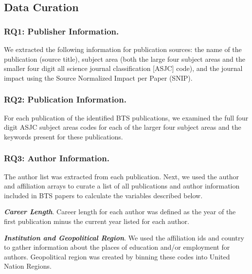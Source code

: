 \documentclass[
  man,floatsintext]{apa6}
\begin{document}
\hypertarget{data-curation}{%
\subsection{Data Curation}\label{data-curation}}

\hypertarget{rq1-publisher-information.}{%
\subsubsection{RQ1: Publisher Information.}\label{rq1-publisher-information.}}

We extracted the following information for publication sources: the name of the publication (source title), subject area (both the large four subject areas and the smaller four digit all science journal classification {[}ASJC{]} code), and the journal
impact using the Source Normalized Impact per Paper (SNIP).

\hypertarget{rq2-publication-information.}{%
\subsubsection{RQ2: Publication Information.}\label{rq2-publication-information.}}

For each publication of the identified BTS publications, we examined
the full four digit ASJC subject areas codes for each of the larger four
subject areas and the keywords present for these publications.

\hypertarget{rq3-author-information.}{%
\subsubsection{RQ3: Author Information.}\label{rq3-author-information.}}

The author list was extracted from each publication. Next, we used the author and affiliation arrays to curate a list of all publications and author information included in BTS papers to calculate the variables described below.

\textbf{\emph{Career Length}}. Career length for each author was defined as
the year of the first publication minus the current year listed for each author.

\textbf{\emph{Institution and Geopolitical Region}}. We used the affiliation
ids and country to gather information about the places of education
and/or employment for authors. Geopolitical region was created by binning these codes into United Nation Regions.
\end{document}
